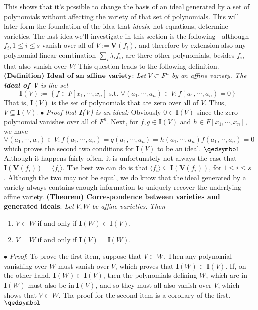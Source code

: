\documentclass{article}
\begin{document}
\newline
This shows that it's possible to change the basis of an ideal generated by a set of polynomials without affecting the variety of that set of polynomials. This will later form the foundation of the idea that \textit{ideals}, not equations, determine varieties.
\newline
The last idea we'll investigate in this section is the following - although $ f_i, 1 \leq i \leq s $ vanish over all of $ V := \mathbf{V}(f_i) $, and therefore by extension also any polynomial linear combination $ \sum_i h_i f_i $, are there other polynomials, besides $ f_i $, that also vanish over $ V $? This question leads to the following definition.
\newline \newline
\textbf{(Definition) Ideal of an affine variety}: \textit{Let $ V \subset F^n $ by an affine variety. The \textbf{ideal of V} is the set}
$$ \mathbf{I}(V) := \left\{ f \in F[x_1, \cdots, x_n] \text{ s.t. } \forall (a_1, \cdots, a_n) \in V: f(a_1, \cdots, a_n) = 0 \right\} $$
That is, $ \mathbf{I}(V) $ is the set of polynomials that are zero over all of $ V $. Thus, $ V \subseteq \mathbf{I}(V) $.
\newline
\indent $ \bullet $ \textit{Proof that \textbf{I}(V) is an ideal:} Obviously $ 0 \in \mathbf{I}(V) $ since the zero polynomial vanishes over all of $ F^n $. Next, for $ f, g \in \mathbf{I}(V) $ and $ h \in F[x_1, \cdots, x_n] $, we have 
$$ \forall (a_1, \cdots, a_n) \in V: f(a_1, \cdots, a_n) = g(a_1, \cdots, a_n) = h(a_1, \cdots, a_n) f(a_1, \cdots, a_n) = 0 $$
which proves the second two conditions for $ \mathbf{I}(V) $ to be an ideal. $ \qedsymbol $
\newline
Although it happens fairly often, it is unfortunately not always the case that $ \mathbf{I}(\mathbf{V}(f_i)) = \langle f_i \rangle $. The best we can do is that $ \langle f_i \rangle \subseteq \mathbf{I}(\mathbf{V}(f_i)) $, for $ 1 \leq i \leq s $. Although the two may not be equal, we do know that the ideal generated by a variety always contains enough information to uniquely recover the underlying affine variety.
\newline \newline
\textbf{(Theorem) Correspondence between varieties and generated ideals}: \textit{Let $ V, W $ be affine varieties. Then}
\begin{enumerate}
	\item $ V \subset W $ if and only if $ \mathbf{I}(W) \subset \mathbf{I}(V) $.
	\item $ V = W $ if and only if $ \mathbf{I}(V) = \mathbf{I}(W) $.
\end{enumerate}
\indent $ \bullet $ \textit{Proof}: To prove the first item, suppose that $ V \subset W $. Then any polynomial vanishing over $ W $ must vanish over $ V $, which proves that $ \mathbf{I}(W) \subset \mathbf{I}(V) $. If, on the other hand, $ \mathbf{I}(W) \subset \mathbf{I}(V) $, then the polynomials defining $ W $, which are in $ \mathbf{I}(W) $ must also be in $ \mathbf{I}(V) $, and so they must all also vanish over $ V $, which shows that $ V \subset W $. The proof for the second item is a corollary of the first. $ \qedsymbol $
\end{document}
